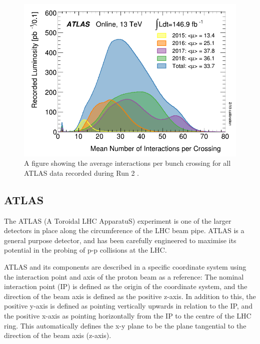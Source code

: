 \documentclass[12pt,a4paper,epsf,portrait,times,epsfig]{article}
\begin{document}
		\begin{figure}
			\centering
			\includegraphics[scale=0.4]{ATLAS_Pileup_Run2.png}
			\caption{A figure showing the average interactions per bunch crossing for all ATLAS data recorded during Run 2 \cite{ATLASLumiPublic}.}
			\label{Fig:ATLASPileup}
		\end{figure}

		
		\subsection{ATLAS}
		
		The ATLAS (A Toroidal LHC ApparatuS) experiment \cite{ATLAS-TDR-01, ATLAS-TDR-02, Article:ATLASDesignPaper} is one of the larger detectors in place along the circumference of the LHC beam pipe. ATLAS is a general purpose detector, and has been carefully engineered to maximise its potential in the probing of p-p collisions at the LHC. \par
		
		ATLAS and its components are described in a specific coordinate system using the interaction point and axis of the proton beam as a reference: The nominal interaction point (IP) is defined as the origin of the coordinate system, and the direction of the beam axis is defined as the positive z-axis. In addition to this, the positive y-axis is defined	as pointing vertically upwards in relation to the IP, and the positive x-axis as pointing	horizontally from the IP to the centre of the LHC ring. This automatically defines the x-y plane to be the plane tangential to the direction of the beam axis (z-axis). \par
		
\end{document}
